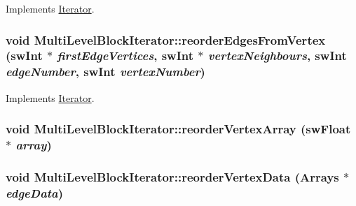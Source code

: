 Implements \hyperlink{classIterator_ad467453135759642e4e4a9f9e5233771}{Iterator}.\hypertarget{classMultiLevelBlockIterator_af2bc453fc11f9e0ba34a1edc7eafc34e}{
\subsubsection[{reorderEdgesFromVertex}]{\setlength{\rightskip}{0pt plus 5cm}void MultiLevelBlockIterator::reorderEdgesFromVertex ({\bf swInt} $\ast$ {\em firstEdgeVertices}, \/  {\bf swInt} $\ast$ {\em vertexNeighbours}, \/  {\bf swInt} {\em edgeNumber}, \/  {\bf swInt} {\em vertexNumber})}}
\label{classMultiLevelBlockIterator_af2bc453fc11f9e0ba34a1edc7eafc34e}


Implements \hyperlink{classIterator_a852bc84ccdfc84a9f0802ee070dd4cac}{Iterator}.\hypertarget{classMultiLevelBlockIterator_a184e9a87ccff9f3eb2c5960434175936}{
\subsubsection[{reorderVertexArray}]{\setlength{\rightskip}{0pt plus 5cm}void MultiLevelBlockIterator::reorderVertexArray ({\bf swFloat} $\ast$ {\em array})}}
\label{classMultiLevelBlockIterator_a184e9a87ccff9f3eb2c5960434175936}
\hypertarget{classMultiLevelBlockIterator_ac442935a4731bb5ae8548bad040ac692}{
\subsubsection[{reorderVertexData}]{\setlength{\rightskip}{0pt plus 5cm}void MultiLevelBlockIterator::reorderVertexData ({\bf Arrays} $\ast$ {\em edgeData})}}
\label{classMultiLevelBlockIterator_ac442935a4731bb5ae8548bad040ac692}


